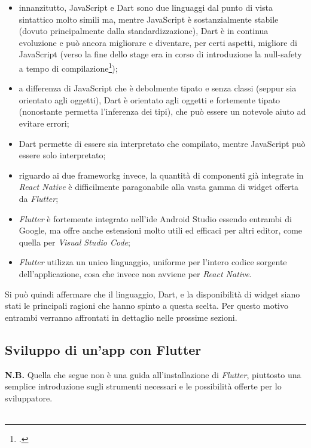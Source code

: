 \begin{itemize}
    \item innanzitutto, JavaScript e Dart sono due linguaggi dal punto di vista sintattico molto simili ma, mentre JavaScript è sostanzialmente stabile (dovuto principalmente dalla standardizzazione), Dart è in continua evoluzione e può ancora migliorare e diventare, per certi aspetti, migliore di JavaScript (verso la fine dello stage era in corso di introduzione la null-safety a tempo di compilazione\footcite{site:null-safety-dart});
    \item a differenza di JavaScript che è debolmente tipato e senza classi (seppur sia orientato agli oggetti), Dart è orientato agli oggetti e fortemente tipato (nonostante permetta l'inferenza dei tipi), che può essere un notevole aiuto ad evitare errori;
    \item Dart permette di essere sia interpretato che compilato, mentre JavaScript può essere solo interpretato;
    \item riguardo ai due \gls{frameworkg} invece, la quantità di componenti già integrate in \emph{React Native} è difficilmente paragonabile alla vasta gamma di widget offerta da \emph{Flutter};
    \item \emph{Flutter} è fortemente integrato nell'\gls{ide} Android Studio essendo entrambi di Google, ma offre anche estensioni molto utili ed efficaci per altri editor, come quella per \emph{Visual Studio Code};
    \item \emph{Flutter} utilizza un unico linguaggio, uniforme per l'intero codice sorgente dell'applicazione, cosa che invece non avviene per \emph{React Native}.
\end{itemize}
Si può quindi affermare che il linguaggio, Dart, e la disponibilità di widget siano stati le principali ragioni che hanno spinto a questa scelta. Per questo motivo entrambi verranno affrontati  in dettaglio nelle prossime sezioni.

\subsection{Sviluppo di un'app con Flutter}
\label{subsec:sviluppo-app-flutter}

\textbf{N.B.} Quella che segue non è una guida all'installazione di \emph{Flutter}, piuttosto una semplice introduzione sugli strumenti necessari e le possibilità offerte per lo sviluppatore.\\\\

